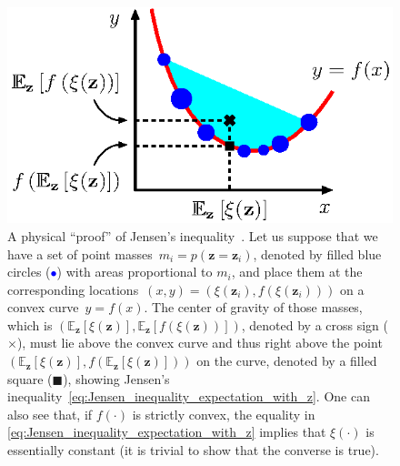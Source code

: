 \documentclass[12pt,a4paper]{article}
\begin{document}
\begin{figure}
\centering
\includegraphics{jensen_inequality.eps}
\caption{A physical ``proof'' of
Jensen's inequality~\citep{MacKay:Information}.
Let us suppose that we have a set of point masses~$m_i = p(\mathbf{z}=\mathbf{z}_i)$,
denoted by filled blue circles ({\large\textcolor{blue}{$\bullet$}})
with areas proportional to $m_i$,
and place them at the corresponding
locations~$(x, y) = \left(\xi(\mathbf{z}_i), f(\xi(\mathbf{z}_i))\right)$
on a convex curve~$y = f(x)$.
The center of gravity of those masses, which is $\left(
\mathbb{E}_{\mathbf{z}}\left[\xi(\mathbf{z})\right],
\mathbb{E}_{\mathbf{z}}\left[f\left(\xi(\mathbf{z})\right)\right]
\right)$, denoted by a cross sign ($\boldsymbol{\times}$),
must lie above the convex curve and thus right above the point~$\left(
\mathbb{E}_{\mathbf{z}}\left[\xi(\mathbf{z})\right],
f\left(\mathbb{E}_{\mathbf{z}}\left[\xi(\mathbf{z})\right]\right)
\right)$ on the curve, denoted by a filled square ($\blacksquare$),
showing Jensen's inequality~\eqref{eq:Jensen_inequality_expectation_with_z}.
One can also see that, if $f(\cdot)$ is strictly convex,
the equality in \eqref{eq:Jensen_inequality_expectation_with_z}
implies that $\xi(\cdot)$ is essentially constant
(it is trivial to show that the converse is true).}
\label{fig:Jensen_inequality}
\end{figure}
\end{document}
